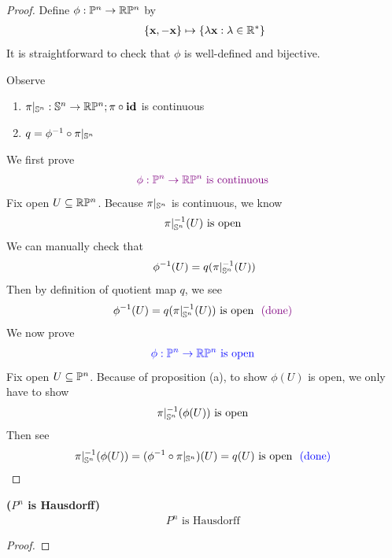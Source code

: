\documentclass{report}
\begin{document}
\begin{proof}
Define $\phi:\P^n\rightarrow \R\P^n$ by 
\begin{align*}
\set{\textbf{x},-\textbf{x}}\mapsto \set{\ld  \textbf{x}:\ld \inr^*}
\end{align*}
It is straightforward to check that $\phi$ is well-defined and bijective.  


Observe  
\begin{enumerate}[label=(\alph*)]
  \item $\pi|_{\S^n}:\S^n\rightarrow \R\P^n;\pi \circ \textbf{id}$ is continuous 
  \item $q=\phi^{-1}\circ \pi|_{\S^n}$
\end{enumerate}
We first prove 
\begin{align*}
  \vi{\phi:\P^n\rightarrow \R\P^n\text{ is continuous }}
\end{align*}
Fix open $U\subseteq \R\P^n$. Because $\pi|_{\S^n}$ is continuous, we know 
\begin{align*}
\pi|_{\S^n}^{-1}(U)\text{ is open }
\end{align*}
We can manually check that 
\begin{align*}
\phi^{-1}(U)=q(\pi|_{\S^n}^{-1}(U)) 
\end{align*}
Then by definition of quotient map $q$, we see 
\begin{align*}
\phi^{-1}(U)=q(\pi|_{\S^n}^{-1} (U))\text{ is open }\vdone
\end{align*}
We now prove 
 \begin{align*}
\blue{\phi:\P^n\rightarrow \R\P^n\text{ is open }}
\end{align*}
Fix open $U\subseteq \P^n$. Because of proposition  (a), to show $\phi (U)$ is open, we only have to show
\begin{align*}
  \pi|_{\S^n}^{-1}(\phi (U))\text{ is open }
\end{align*}
Then see 
\begin{align*}
\pi |^{-1}_{\S^n}(\phi (U))= (\phi^{-1}\circ \pi |_{\S^n})(U)=q(U)\text{ is open } \bdone
\end{align*}
\end{proof}
\begin{theorem}
\label{P^n is Hausdorff}
\textbf{($P^n$ is Hausdorff)} 
\begin{align*}
P^n\text{ is Hausdorff }
\end{align*}
\end{theorem}
\begin{proof}

\end{proof}
\end{document}
